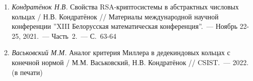 \begin{enumerate}
    \item \label{source:XIII_Belarussian_math_conference_2021}
    \textit{Кондратёнок Н.В.} Свойства RSA-криптосистемы в абстрактных числовых кольцах / Н.В. Кондратёнок // Материалы международной научной конференции ''XIII Белорусская математическая конференция''.~--- Ноябрь 22-25, 2021.~--- Часть~2.~--- С.~63-64

    \item \label{source:CSIST_2022}
    \textit{Васьковский М.М.} Аналог критерия Миллера в дедекиндовых кольцах с конечной нормой / М.М. Васьковский, Н.В. Кондратёнок // CSIST.~--- 2022. (в печати)

\end{enumerate}

